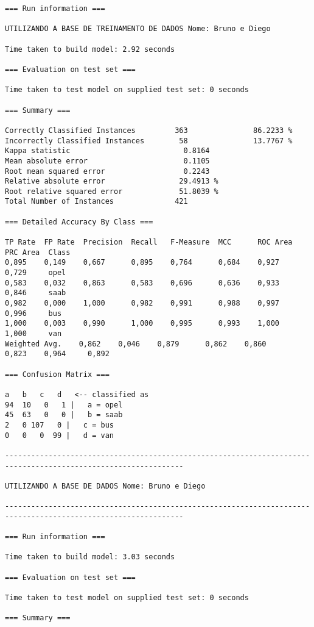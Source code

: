 \documentclass[
	article,			%
	11pt,				%
	oneside,			%
	a4paper,			%
	english,			%
	brazil,				%
	sumario=tradicional
	]{abntex2}
\begin{document}
\begin{lstlisting}
=== Run information ===

UTILIZANDO A BASE DE TREINAMENTO DE DADOS Nome: Bruno e Diego

Time taken to build model: 2.92 seconds

=== Evaluation on test set ===

Time taken to test model on supplied test set: 0 seconds

=== Summary ===

Correctly Classified Instances         363               86.2233 %
Incorrectly Classified Instances        58               13.7767 %
Kappa statistic                          0.8164
Mean absolute error                      0.1105
Root mean squared error                  0.2243
Relative absolute error                 29.4913 %
Root relative squared error             51.8039 %
Total Number of Instances              421     

=== Detailed Accuracy By Class ===

TP Rate  FP Rate  Precision  Recall   F-Measure  MCC      ROC Area  PRC Area  Class
0,895    0,149    0,667      0,895    0,764      0,684    0,927     0,729     opel
0,583    0,032    0,863      0,583    0,696      0,636    0,933     0,846     saab
0,982    0,000    1,000      0,982    0,991      0,988    0,997     0,996     bus
1,000    0,003    0,990      1,000    0,995      0,993    1,000     1,000     van
Weighted Avg.    0,862    0,046    0,879      0,862    0,860      0,823    0,964     0,892     

=== Confusion Matrix ===

a   b   c   d   <-- classified as
94  10   0   1 |   a = opel
45  63   0   0 |   b = saab
2   0 107   0 |   c = bus
0   0   0  99 |   d = van

---------------------------------------------------------------------------------------------------------------

UTILIZANDO A BASE DE DADOS Nome: Bruno e Diego

---------------------------------------------------------------------------------------------------------------

=== Run information ===

Time taken to build model: 3.03 seconds

=== Evaluation on test set ===

Time taken to test model on supplied test set: 0 seconds

=== Summary ===


\end{lstlisting}
\end{document}
